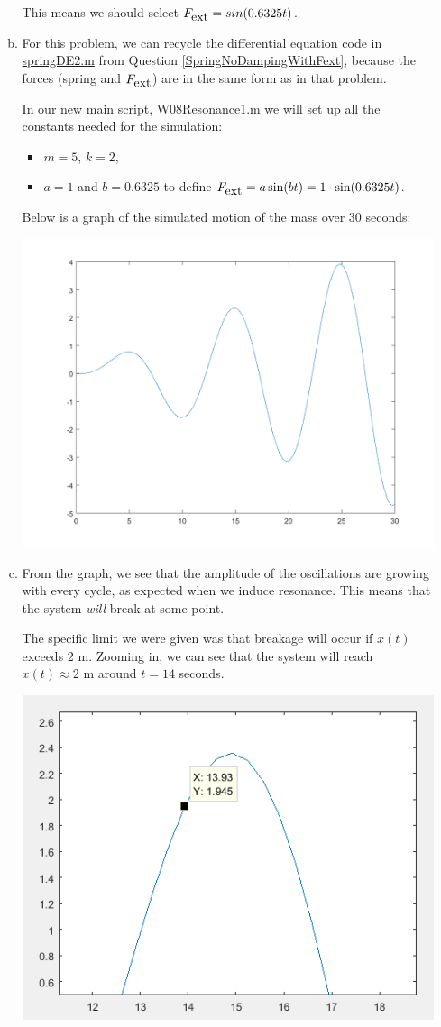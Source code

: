 \begin{enumerate}
\begin{Solution}
\begin{enumerate}[(a)]
    This means we should select $F_{\mbox{ext}} = sin( 0.6325 t)$.

  \item For this problem, we can recycle the differential equation
    code in
    \href{http://www.mast.queensu.ca/~apsc171/MNTCP01/PracticeProblems/MATLAB/springDE2.m}{springDE2.m}
    from Question \ref{SpringNoDampingWithFext}, because the forces
    (spring and $F_{\mbox{ext}}$) are in the same form as in that problem.

    In our new main script,
    \href{http://www.mast.queensu.ca/~apsc171/MNTCP01/PracticeProblems/MATLAB/W08Resonance1.m}{W08Resonance1.m}
    we will set up all the constants needed for the simulation:
    \begin{itemize}
    \item $m = 5$, $k = 2$, 
    \item $a = 1$ and $b= 0.6325$ to define
      $F_{\mbox{ext}} = a \sin(bt) = 1 \cdot \sin(0.6325 t)$.
    \end{itemize}

    Below is a graph of the simulated motion of the mass over 30
    seconds:
\begin{center}
\includegraphics[width=0.4\linewidth]{graphics/Week08_Spring/W08SpringResonance1}
\end{center}

\item From the graph, we see that the amplitude of the oscillations
  are growing with every cycle, as expected when we induce resonance.  This means that the system {\em will } break at some point. 

  The specific limit we were given was that breakage will occur if
  $x(t)$ exceeds 2 m. Zooming in, we can see that the system will
  reach $x(t) \approx 2$ m around $t = 14$ seconds.

\begin{center}
\includegraphics[width=0.4\linewidth]{graphics/Week08_Spring/W08Resonance1_BreakPoint}
\end{center}


\end{enumerate}
\end{Solution}
\end{enumerate}

